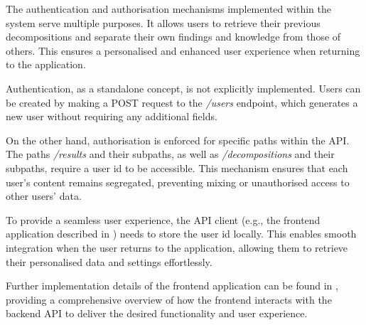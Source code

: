 The authentication and authorisation mechanisms implemented within the system
serve multiple purposes. It allows users to retrieve their previous
decompositions and separate their own findings and knowledge from those of
others. This ensures a personalised and enhanced user experience when returning
to the application.

Authentication, as a standalone concept, is not explicitly implemented. Users
can be created by making a POST request to the \textit{/users} endpoint, which
generates a new user without requiring any additional fields.

On the other hand, authorisation is enforced for specific paths within the API.
The paths \textit{/results} and their subpaths, as well as
\textit{/decompositions} and their subpaths, require a user id to be
accessible. This mechanism ensures that each user's content remains segregated,
preventing mixing or unauthorised access to other users' data.

To provide a seamless user experience, the API client (e.g., the frontend
application described in ) needs to store the user id
locally. This enables smooth integration when the user returns to the
application, allowing them to retrieve their personalised data and settings
effortlessly.

Further implementation details of the frontend application can be found in
, providing a comprehensive overview of how the
frontend interacts with the backend API to deliver the desired functionality
and user experience.
